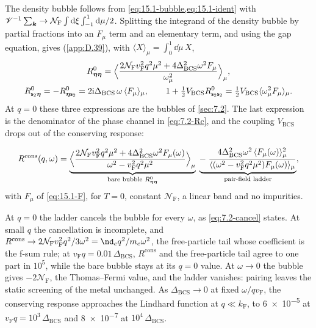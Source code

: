 The density bubble follows from \cref{eq:15.1-bubble,eq:15.1-ident} with $\mathscr{V}^{-1}\sum_{\bm{k}} \to \mathcal{N}_{\mathrm{F}}\int\mathrm{d}\xi\int_{-1}^1\mathrm{d}\mu/2$. Splitting the integrand of the density bubble by partial fractions into an $F_\mu$ term and an elementary term, and using the gap equation, gives (\cref{app:D.39}), with $\langle X\rangle_\mu = \int_0^1\dd\mu\,X$,
\begin{equation}
  \begin{gathered}
  R^0_{\boldsymbol{\eta}\boldsymbol{\eta}} = \Bigl\langle\frac{2\mathcal{N}_{\mathrm{F}}v_{\mathrm{F}}^2q^2\mu^2 + 4\Delta_{\mathrm{BCS}}^2\omega^2F_\mu}{\omega_\mu^2}\Bigr\rangle_\mu, \\
  R^0_{\mathsf{s}_2\boldsymbol{\eta}} = -R^0_{\boldsymbol{\eta}\mathsf{s}_2} = 2\mathrm{i}\Delta_{\mathrm{BCS}}\,\omega\,\langle F_\mu\rangle_\mu, \qquad
  1 + \tfrac12V_{\mathrm{BCS}}R^0_{\mathsf{s}_2\mathsf{s}_2} = \tfrac12V_{\mathrm{BCS}}\langle\omega_\mu^2F_\mu\rangle_\mu .
  \end{gathered}
  \label{eq:15.1-bubbles}
\end{equation}
At $q = 0$ these three expressions are the bubbles of \cref{sec:7.2}. The last expression is the denominator of the phase channel in \cref{eq:7.2-Rc}, and the coupling $V_{\mathrm{BCS}}$ drops out of the conserving response:
\begin{keyresult}
\begin{equation}
  R^{\mathrm{cons}}(q,\omega) = \underbrace{\Bigl\langle\frac{2\mathcal{N}_{\mathrm{F}}v_{\mathrm{F}}^2q^2\mu^2 + 4\Delta_{\mathrm{BCS}}^2\omega^2F_\mu(\omega)}{\omega^2 - v_{\mathrm{F}}^2q^2\mu^2}\Bigr\rangle_\mu}_{\text{bare bubble } R^0_{\boldsymbol{\eta}\boldsymbol{\eta}}}
  \;\underbrace{-\;\frac{4\Delta_{\mathrm{BCS}}^2\omega^2\,\langle F_\mu(\omega)\rangle_\mu^2}{\langle(\omega^2 - v_{\mathrm{F}}^2q^2\mu^2)F_\mu(\omega)\rangle_\mu}}_{\text{pair-field ladder}} ,
  \label{eq:15.1-Rcons}
\end{equation}
with $F_\mu$ of \cref{eq:15.1-F}, for $T = 0$, constant $\mathcal{N}_{\mathrm{F}}$, a linear band and no impurities.
\end{keyresult}
\noindent At $q = 0$ the ladder cancels the bubble for every $\omega$, as \cref{eq:7.2-cancel} states. At small $q$ the cancellation is incomplete, and $R^{\mathrm{cons}} \to 2\mathcal{N}_{\mathrm{F}}v_{\mathrm{F}}^2q^2/3\omega^2 = \nd_eq^2/m_e\omega^2$, the free-particle tail whose coefficient is the f-sum rule; at $v_{\mathrm{F}}q = 0.01\,\Delta_{\mathrm{BCS}}$, $R^{\mathrm{cons}}$ and the free-particle tail agree to one part in $10^5$, while the bare bubble stays at its $q = 0$ value. At $\omega \to 0$ the bubble gives $-2\mathcal{N}_{\mathrm{F}}$, the Thomas--Fermi value, and the ladder vanishes: pairing leaves the static screening of the metal unchanged. As $\Delta_{\mathrm{BCS}} \to 0$ at fixed $\omega/qv_{\mathrm{F}}$, the conserving response approaches the Lindhard function at $q \ll k_{\mathrm{F}}$, to \num{6e-5} at $v_{\mathrm{F}}q = 10^3\,\Delta_{\mathrm{BCS}}$ and \num{8e-7} at $10^4\,\Delta_{\mathrm{BCS}}$.

